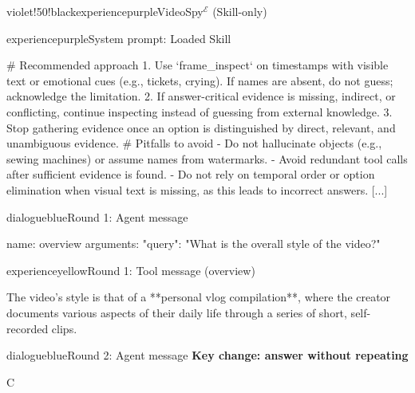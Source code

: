 \begin{ExecutionBox}{violet!50!black}{experiencepurple}{VideoSpy$^{\mathcal{E}}$ (Skill-only)}
\raggedright
{}\par
\begin{MessageBox}{experiencepurple}{System prompt: Loaded Skill}
\begin{Trajectory}[highlightlines={4,7},highlightcolor=yellow!25]
[...] # Recommended approach
1. Use `frame_inspect` on timestamps with visible text or emotional cues (e.g., tickets, crying). If names are absent, do not guess; acknowledge the limitation.
2. If answer-critical evidence is missing, indirect, or conflicting, continue inspecting instead of guessing from external knowledge.
3. Stop gathering evidence once an option is distinguished by direct, relevant, and unambiguous evidence.
# Pitfalls to avoid
- Do not hallucinate objects (e.g., sewing machines) or assume names from watermarks.
- Avoid redundant tool calls after sufficient evidence is found.
- Do not rely on temporal order or option elimination when visual text is missing, as this leads to incorrect answers. [...]
\end{Trajectory}
\end{MessageBox}
\begin{MessageBox}{dialogueblue}{Round 1: Agent message}
\begin{Trajectory}
name: overview  arguments: {"query": "What is the overall style of the video?"}
\end{Trajectory}
\end{MessageBox}
\begin{MessageBox}{experienceyellow}{Round 1: Tool message (overview)}
\begin{Trajectory}
[...] The video's style is that of a **personal vlog compilation**, where the creator documents various aspects of their daily life through a series of short, self-recorded clips.
\end{Trajectory}
\end{MessageBox}
\begin{MessageBox}[agent message,frame hidden,borderline={1pt}{0pt}{changeaccent,dash pattern=on 3pt off 2pt},colbacktitle=red!4]{dialogueblue}{Round 2: Agent message}
\noindent\textcolor{changeaccent}{\textbf{Key change: answer without repeating}}\par
\begin{Trajectory}
C
\end{Trajectory}
\end{MessageBox}
\end{ExecutionBox}


